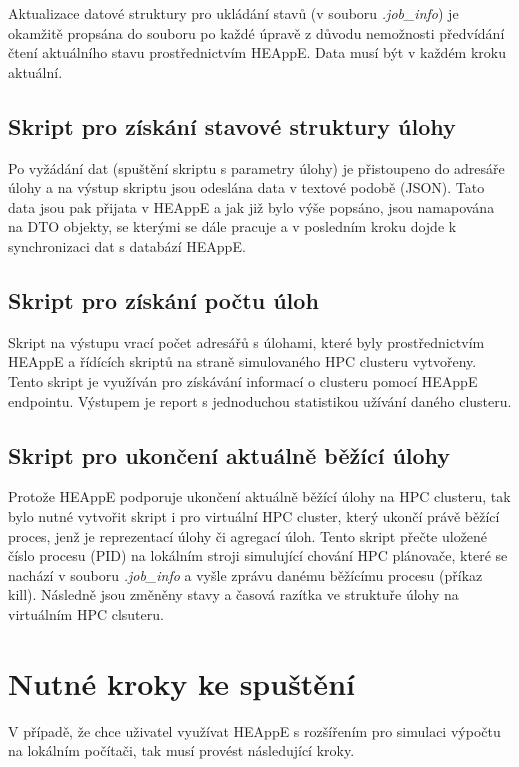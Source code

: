 Aktualizace datové struktury pro ukládání stavů (v souboru \emph{.job\_info}) je okamžitě propsána do souboru po každé úpravě z důvodu nemožnosti předvídání čtení aktuálního stavu prostřednictvím HEAppE. Data musí být v každém kroku aktuální.

\subsection{Skript pro získání stavové struktury úlohy}
Po vyžádání dat (spuštění skriptu s parametry úlohy) je přistoupeno do adresáře úlohy a na výstup skriptu jsou odeslána data v textové podobě (JSON). Tato data jsou pak přijata v HEAppE a jak již bylo výše popsáno, jsou namapována na DTO objekty, se kterými se dále pracuje a v posledním kroku dojde k synchronizaci dat s databází HEAppE.

\subsection{Skript pro získání počtu úloh}
Skript na výstupu vrací počet adresářů s úlohami, které byly prostřednictvím HEAppE a řídících skriptů na straně simulovaného HPC clusteru vytvořeny. Tento skript je využíván pro získávání informací o clusteru pomocí HEAppE endpointu. Výstupem je report s jednoduchou statistikou užívání daného clusteru.

\subsection{Skript pro ukončení aktuálně běžící úlohy}
Protože HEAppE podporuje ukončení aktuálně běžící úlohy na HPC clusteru, tak bylo nutné vytvořit skript i pro virtuální HPC cluster, který ukončí právě běžící proces, jenž je reprezentací úlohy či agregací úloh. Tento skript přečte uložené číslo procesu (PID) na lokálním stroji simulující chování HPC plánovače, které se nachází v souboru \emph{.job\_info} a vyšle zprávu danému běžícímu procesu (příkaz kill). Následně jsou změněny stavy a časová razítka ve struktuře úlohy na virtuálním HPC clsuteru.

\section{Nutné kroky ke spuštění}
V případě, že chce uživatel využívat HEAppE s rozšířením pro simulaci výpočtu na lokálním počítači, tak musí provést následující kroky.

